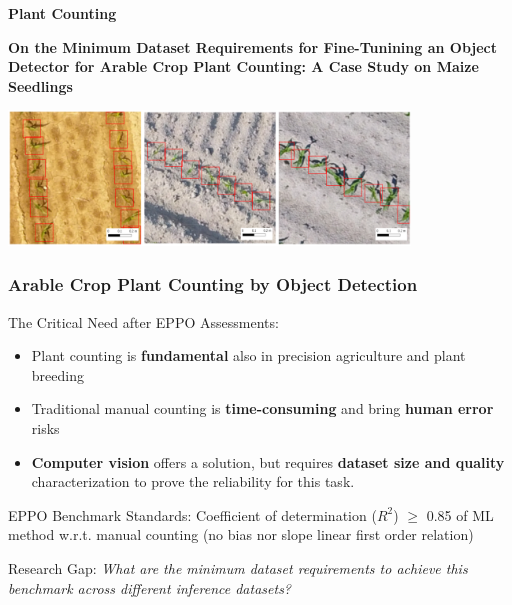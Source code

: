 \documentclass[aspectratio=43]{beamer}
\begin{document}
\begin{frame}
    \begin{center}
        \Huge \textbf{Plant Counting}
        \vspace{0.5cm}
        
        \Large \textbf{On the Minimum Dataset Requirements for Fine-Tunining an Object Detector for Arable Crop Plant Counting: A Case Study on Maize Seedlings}
        
        \vspace{1cm}
        \begin{center}
            \includegraphics[width=0.8\textwidth]{Imgs/dataset_example.png}
        \end{center}
    \end{center}
\end{frame}

\begin{frame}
    \frametitle{Arable Crop Plant Counting by Object Detection}
    
    \begin{block}{The Critical Need after EPPO Assessments:}
        \begin{itemize}
            \item Plant counting is \textbf{fundamental} also in precision agriculture and plant breeding
            \item Traditional manual counting is \textbf{time-consuming} and bring \textbf{human error} risks
            \item \textbf{Computer vision} offers a solution, but requires \textbf{dataset size and quality} characterization to prove the reliability for this task.
        \end{itemize}
    \end{block}
    
    \begin{exampleblock}{EPPO Benchmark Standards:}
        Coefficient of determination ($R^2$) $\geq$ 0.85 of ML method w.r.t. manual counting (no bias nor slope linear first order relation)
    \end{exampleblock}
    
    \begin{alertblock}{Research Gap:}
        \textit{What are the minimum dataset requirements to achieve this benchmark across different inference datasets?}
    \end{alertblock}
\end{frame}
\end{document}
